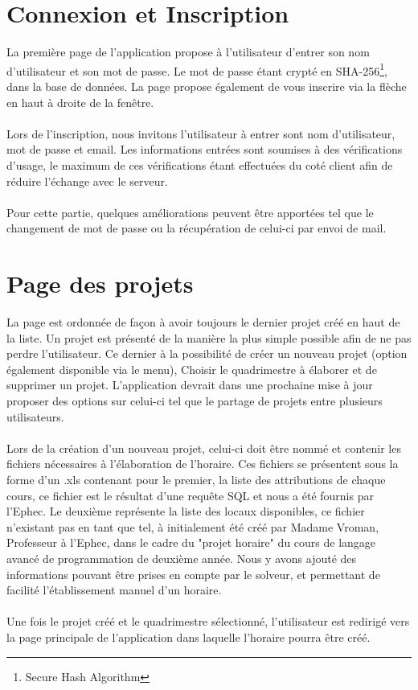 \section{Connexion et Inscription}

La première page de l'application propose à l'utilisateur d'entrer son nom d'utilisateur et son mot de passe. Le mot de passe étant crypté en SHA-256\footnote{Secure Hash Algorithm}, dans la base de données. La page propose également de vous inscrire via la flèche en haut à droite de la fenêtre.\\
\\
Lors de l'inscription, nous invitons l'utilisateur à entrer sont nom d'utilisateur, mot de passe et email. Les informations entrées sont soumises à des vérifications d'usage, le maximum de ces vérifications étant effectuées du coté client afin de réduire l'échange avec le serveur.\\
\\
Pour cette partie, quelques améliorations peuvent être apportées tel que le changement de mot de passe ou la récupération de celui-ci par envoi de mail.

\section{Page des projets}
La page est ordonnée de façon à avoir toujours le dernier projet créé en haut de la liste. Un projet est présenté de la manière la plus simple possible afin de ne pas perdre l'utilisateur. Ce dernier à la possibilité de créer un nouveau projet (option également disponible via le menu), Choisir le quadrimestre à élaborer et de supprimer un projet. L'application devrait dans une prochaine mise à jour proposer des options sur celui-ci tel que le partage de projets entre plusieurs utilisateurs.\\
\\
Lors de la création d'un nouveau projet, celui-ci doit être nommé et contenir les fichiers nécessaires à l'élaboration de l'horaire. Ces fichiers se présentent sous la forme d'un .xls contenant pour le premier, la liste des attributions de chaque cours, ce fichier est le résultat d'une requête SQL et nous a été fournis par l'Ephec. Le deuxième représente la liste des locaux disponibles, ce fichier n'existant pas en tant que tel, à initialement été créé par Madame Vroman, Professeur à l'Ephec, dans le cadre du "projet horaire" du cours de langage avancé de programmation de deuxième année. Nous y avons ajouté des informations pouvant être prises en compte par le solveur, et permettant de facilité l'établissement manuel d'un horaire.\\
\\
Une fois le projet créé et le quadrimestre sélectionné, l'utilisateur est redirigé vers la page principale de l'application dans laquelle l'horaire pourra être créé.

